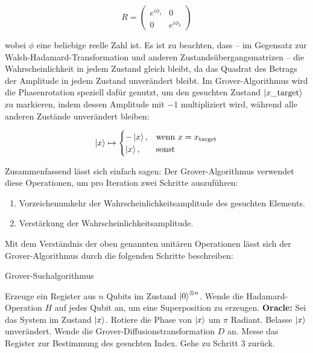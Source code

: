 \begin{enumerate}
    $$
R = \begin{pmatrix}
e^{i\phi_1} & 0 \\
0 & e^{i\phi_2}
\end{pmatrix}
$$

wobei \( \phi \) eine beliebige reelle Zahl ist. Es ist zu beachten, dass – im Gegensatz zur Walsh-Hadamard-Transformation und anderen Zustandsübergangsmatrizen – die Wahrscheinlichkeit in jedem Zustand gleich bleibt, da das Quadrat des Betrags der Amplitude in jedem Zustand unverändert bleibt.
Im Grover-Algorithmus wird die Phasenrotation speziell dafür genutzt, um den gesuchten Zustand $\ket{x\_{\text{target}}}$ zu markieren, indem dessen Amplitude mit $-1$ multipliziert wird, während alle anderen Zustände unverändert bleiben:

$$
\ket{x} \mapsto 
\begin{cases}
- \ket{x}, & \text{wenn } x = x_{\text{target}} \\
\ket{x}, & \text{sonst}
\end{cases}
$$

\end{enumerate}

Zusammenfassend lässt sich einfach sagen: Der Grover-Algorithmus verwendet diese Operationen, um pro Iteration zwei Schritte auszuführen:
\begin{enumerate}
  \item Vorzeichenumkehr der Wahrscheinlichkeitsamplitude des gesuchten Elements.
  \item Verstärkung der Wahrscheinlichkeitsamplitude.
\end{enumerate}

Mit dem Verständnis der oben genannten unitären Operationen lässt sich der Grover-Algorithmus durch die folgenden Schritte beschreiben:

\begin{algorithm}[H]
\label{alg:grover}
\caption{Grover-Suchalgorithmus}
\begin{algorithmic}[1]
\State Erzeuge ein Register aus \( n \) Qubits im Zustand \( \ket{0}^{\otimes n} \).
\State Wende die Hadamard-Operation \( H \) auf jedes Qubit an, um eine Superposition zu erzeugen.
\Repeat
  \State\textbf{Oracle:}
  \State \hspace{1em} Sei das System im Zustand \( \ket{x} \).
    \State Rotiere die Phase von \( \ket{x} \) um \( \pi \) Radiant.
  \Else
    \State Belasse \( \ket{x} \) unverändert.
  \EndIf
  \State Wende die Grover-Diffusionstransformation $D$ an.
  \State Messe das Register zur Bestimmung des gesuchten Index.
  \State Gehe zu Schritt 3 zurück.
\EndIf
{}
\end{algorithmic}
\end{algorithm}

